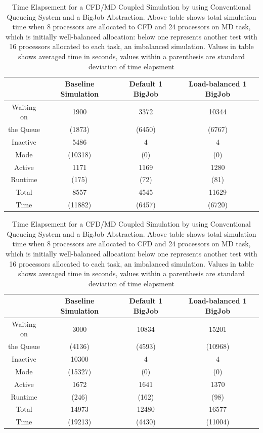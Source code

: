 \documentclass[conference,final]{IEEEtran}
\begin{document}
\begin{table}[!h]
\begin{center}
  \caption{\small Time Elapsement for a CFD/MD Coupled Simulation by using Conventional Queueing System and a BigJob Abstraction. Above table shows total simulation time when 8 processors are allocated to CFD and 24 processors on MD task, which is initially well-balanced allocation: below one represents another test with 16 processors allocated to each task, an imbalanced simulation. Values in table shows averaged time in seconds, values within a parenthesis are standard deviation of time elapsment \newline }
\begin{tabular}{ c|| c | c | c }
\hline
 & Baseline Simulation & Default 1 BigJob & Load-balanced 1 BigJob \\
\hline
\hline
Waiting on & 1900 & 3372 & 10344  \\
the Queue & (1873) & (6450) & (6767) \\
\hline
Inactive & 5486 & 4 & 4 \\
Mode & (10318) & (0) & (0) \\
\hline
Active & 1171 & 1169 & 1280 \\
Runtime & (175) & (72) & (81) \\
\hline
Total & 8557 & 4545 & 11629 \\
Time & (11882) & (6457) & (6720) \\
\hline
\end{tabular}

\begin{tabular}{ c|| c | c | c }
\hline
 & Baseline Simulation & Default 1 BigJob & Load-balanced 1 BigJob \\
\hline
\hline
Waiting on & 3000 & 10834 & 15201  \\
the Queue & (4136) & (4593) & (10968) \\
\hline
Inactive & 10300 & 4 & 4 \\
Mode & (15327) & (0) & (0) \\
\hline
Active & 1672 & 1641 & 1370 \\
Runtime & (246) & (162) & (98) \\
\hline
Total & 14973 & 12480 & 16577 \\
Time & (19213) & (4430) & (11004) \\
\hline
\end{tabular}
\end{center}
\end{table}
\end{document}
